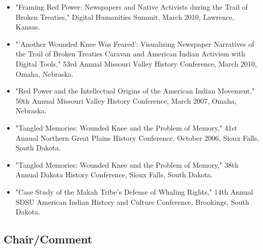 \documentclass[10pt]{article}
\begin{document}
\begin{itemize}
  \item "Framing Red Power: Newspapers and Native Activists during the Trail of Broken Treaties," Digital Humanities Summit, March 2010, Lawrence, Kansas.
  
  \item "'Another Wounded Knee Was Feared': Visualizing Newspaper Narratives of the Trail of Broken Treaties Caravan and American Indian Activism with Digital Tools," 53rd Annual Missouri Valley History Conference, March 2010, Omaha, Nebraska.
  
  \item "Red Power and the Intellectual Origins of the American Indian Movement," 50th Annual Missouri Valley History Conference, March 2007, Omaha, Nebraska.
  
  \item "Tangled Memories: Wounded Knee and the Problem of Memory," 41st Annual Northern Great Plains History Conference, October 2006, Sioux Falls, South Dakota.
  
  \item "Tangled Memories: Wounded Knee and the Problem of Memory," 38th Annual Dakota History Conference, Sioux Falls, South Dakota.
  
  \item "Case Study of the Makah Tribe's Defense of Whaling Rights," 14th Annual SDSU American Indian History and Culture Conference, Brookings, South Dakota.
\end{itemize}

\subsection*{Chair/Comment}
\end{document}
